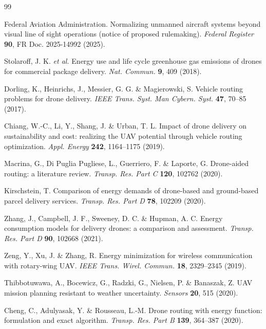 \begin{thebibliography}{99}
\small

 Federal Aviation Administration. Normalizing unmanned aircraft systems beyond visual line of sight operations (notice of proposed rulemaking). \textit{Federal Register} \textbf{90}, FR Doc. 2025-14992 (2025).

 Stolaroff, J. K. \textit{et al.} Energy use and life cycle greenhouse gas emissions of drones for commercial package delivery. \textit{Nat. Commun.} \textbf{9}, 409 (2018).

 Dorling, K., Heinrichs, J., Messier, G. G. \& Magierowski, S. Vehicle routing problems for drone delivery. \textit{IEEE Trans. Syst. Man Cybern. Syst.} \textbf{47}, 70--85 (2017).

 Chiang, W.-C., Li, Y., Shang, J. \& Urban, T. L. Impact of drone delivery on sustainability and cost: realizing the UAV potential through vehicle routing optimization. \textit{Appl. Energy} \textbf{242}, 1164--1175 (2019).

 Macrina, G., Di Puglia Pugliese, L., Guerriero, F. \& Laporte, G. Drone-aided routing: a literature review. \textit{Transp. Res. Part C} \textbf{120}, 102762 (2020).

 Kirschstein, T. Comparison of energy demands of drone-based and ground-based parcel delivery services. \textit{Transp. Res. Part D} \textbf{78}, 102209 (2020).

 Zhang, J., Campbell, J. F., Sweeney, D. C. \& Hupman, A. C. Energy consumption models for delivery drones: a comparison and assessment. \textit{Transp. Res. Part D} \textbf{90}, 102668 (2021).

 Zeng, Y., Xu, J. \& Zhang, R. Energy minimization for wireless communication with rotary-wing UAV. \textit{IEEE Trans. Wirel. Commun.} \textbf{18}, 2329--2345 (2019).

 Thibbotuwawa, A., Bocewicz, G., Radzki, G., Nielsen, P. \& Banaszak, Z. UAV mission planning resistant to weather uncertainty. \textit{Sensors} \textbf{20}, 515 (2020).

 Cheng, C., Adulyasak, Y. \& Rousseau, L.-M. Drone routing with energy function: formulation and exact algorithm. \textit{Transp. Res. Part B} \textbf{139}, 364--387 (2020).


\end{thebibliography}
